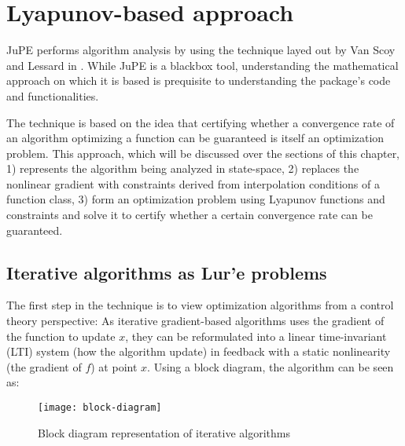 \chapter{Lyapunov-based approach}

JuPE performs algorithm analysis by using the technique layed out by Van Scoy and Lessard in \cite{tutorial}. While JuPE is a blackbox tool, understanding the mathematical approach on which it is based is prequisite to understanding the package's code and functionalities.

The technique is based on the idea that certifying whether a convergence rate of an algorithm optimizing a function can be guaranteed is itself an optimization problem. This approach, which will be discussed over the sections of this chapter, 1) represents the algorithm being analyzed in state-space, 2) replaces the nonlinear gradient with constraints derived from interpolation conditions of a function class, 3) form an optimization problem using Lyapunov functions and constraints and solve it to certify whether a certain convergence rate can be guaranteed.
\section{Iterative algorithms as Lur'e problems}

The first step in the technique is to view optimization algorithms from a control theory perspective: As iterative gradient-based algorithms uses the gradient of the function to update \(x\), they can be reformulated into a linear time-invariant (LTI) system (how the algorithm update) in feedback with a static nonlinearity (the gradient of \(f\)) at point \(x\). Using a block diagram, the algorithm can be seen as:

\begin{figure}[h]
    \centering
	\texttt{[image: block-diagram]}
    \caption{Block diagram representation of iterative algorithms}
    \label{plot_block_diagram}
\end{figure}

